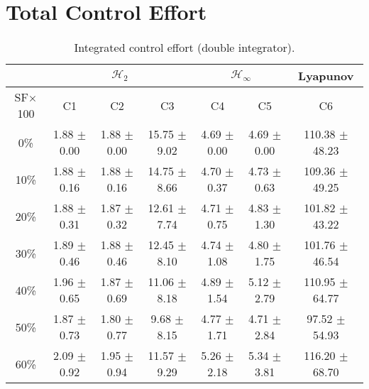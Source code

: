 \section{Total Control Effort}
\begin{table}[H]
\centering
\scriptsize
\begin{tabular}{| c || c | c | c | c | c | c |}
	\hline
	 & \multicolumn{3}{c|}{$\mathcal{H}_{2}$} & \multicolumn{2}{c|}{$\mathcal{H}_{\infty}$} & Lyapunov\\
	\hline
	SF$\times$100 & C1& C2 & C3 & C4 & C5 & C6\\
	\hline\hline
	0\% & 1.88 $\pm$ 0.00 & 1.88 $\pm$ 0.00 & 15.75 $\pm$ 9.02 & 4.69 $\pm$ 0.00 & 4.69 $\pm$ 0.00 & 110.38 $\pm$ 48.23\\
	\hline
	10\% & 1.88 $\pm$ 0.16 & 1.88 $\pm$ 0.16 & 14.75 $\pm$ 8.66 & 4.70 $\pm$ 0.37 & 4.73 $\pm$ 0.63 & 109.36 $\pm$ 49.25\\
	\hline
	20\% & 1.88 $\pm$ 0.31 & 1.87 $\pm$ 0.32 & 12.61 $\pm$ 7.74 & 4.71 $\pm$ 0.75 & 4.83 $\pm$ 1.30 & 101.82 $\pm$ 43.22\\
	\hline
	30\% & 1.89 $\pm$ 0.46 & 1.88 $\pm$ 0.46 & 12.45 $\pm$ 8.10 & 4.74 $\pm$ 1.08 & 4.80 $\pm$ 1.75 & 101.76 $\pm$ 46.54\\
	\hline
	40\% & 1.96 $\pm$ 0.65 & 1.87 $\pm$ 0.69 & 11.06 $\pm$ 8.18 & 4.89 $\pm$ 1.54 & 5.12 $\pm$ 2.79 & 110.95 $\pm$ 64.77\\
	\hline
	50\% & 1.87 $\pm$ 0.73 & 1.80 $\pm$ 0.77 & 9.68 $\pm$ 8.15 & 4.77 $\pm$ 1.71 & 4.71 $\pm$ 2.84 & 97.52 $\pm$ 54.93\\
	\hline
	60\% & 2.09 $\pm$ 0.92 & 1.95 $\pm$ 0.94 & 11.57 $\pm$ 9.29 & 5.26 $\pm$ 2.18 & 5.34 $\pm$ 3.81 & 116.20 $\pm$ 68.70\\
	\hline
\end{tabular}
\caption{Integrated control effort (double integrator).}
\label{table:control_effort_double_integrator:unc}
\end{table}

